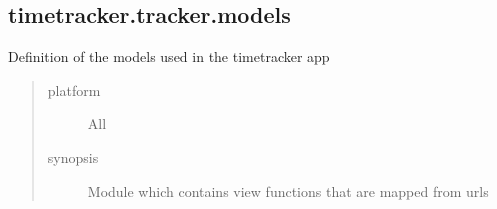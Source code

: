 \documentclass[letterpaper,10pt,english]{sphinxmanual}
\begin{document}
\subsection{timetracker.tracker.models}
\label{timetracker:module-timetracker.tracker.models}\label{timetracker:timetracker-tracker-models}
Definition of the models used in the timetracker app
\begin{quote}\begin{description}
\item[{platform}] \leavevmode
All

\item[{synopsis}] \leavevmode
Module which contains view functions that are mapped from urls

\end{description}\end{quote}
\end{document}
